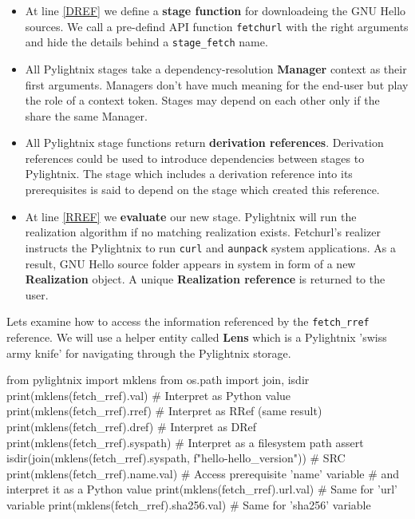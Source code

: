 \documentclass{article}
\begin{document}
\begin{itemize}

  \item At line \ref{DREF} we define a \textbf{stage function} for
    downloadeing the GNU Hello sources. We
    call a pre-defind API function \texttt{fetchurl} with the right
    arguments and hide the details behind a \texttt{stage\_fetch} name.

  \item All Pylightnix stages take a dependency-resolution \textbf{Manager}
    context as their first arguments. Managers don't have much meaning for
    the end-user but play the role of a context token. Stages may depend on
    each other only if the share the same Manager.

  \item All Pylightnix stage functions return \textbf{derivation
    references}. Derivation references could be used to introduce
    dependencies between stages to Pylightnix. The stage which includes a
    derivation reference into its prerequisites is said to depend on the
    stage which created this reference.

  \item At line \ref{RREF} we \textbf{evaluate} our new stage. Pylightnix will
    run the realization algorithm if no matching realization exists.
    Fetchurl's realizer instructs the Pylightnix to run \texttt{curl} and
    \texttt{aunpack} system applications. As a result, GNU Hello source folder
    appears in system in form of a new \textbf{Realization} object. A unique
    \textbf{Realization reference} is returned to the user.

\end{itemize}

Lets examine how to access the information referenced by the
\texttt{fetch\_rref} reference. We will use a helper entity called
\textbf{Lens} which is a Pylightnix 'swiss army knife' for navigating through
the Pylightnix storage.

\begin{pythontexcode}
  from pylightnix import mklens
  from os.path import join, isdir
  print(mklens(fetch_rref).val)      # Interpret as Python value
  print(mklens(fetch_rref).rref)     # Interpret as RRef (same result)
  print(mklens(fetch_rref).dref)     # Interpret as DRef
  print(mklens(fetch_rref).syspath)  # Interpret as a filesystem path
  assert isdir(join(mklens(fetch_rref).syspath,
               f"hello-{hello_version}"))  # SRC \label{SRC}
  print(mklens(fetch_rref).name.val) # Access prerequisite 'name' variable
                                     # and interpret it as a Python value
  print(mklens(fetch_rref).url.val)  # Same for 'url' variable
  print(mklens(fetch_rref).sha256.val)  # Same for 'sha256' variable
\end{pythontexcode}
\end{document}
